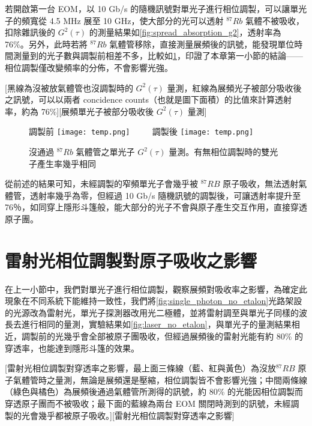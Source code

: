 \documentclass[class=NCU_thesis, crop=false]{standalone}
\begin{document}
若開啟第一台 EOM，以 10 Gb/s 的隨機訊號對單光子進行相位調製，可以讓單光子的頻寬從 4.5 MHz 展至 10 GHz，使大部分的光可以透射 $^{87}Rb$ 氣體不被吸收，扣除雜訊後的 $G^2(\tau)$ 的測量結果如\cref{fig:spread_absorption_g2}，透射率為 76\%。另外，此時若將 $^{87}Rb$ 氣體管移除，直接測量展頻後的訊號，能發現單位時間測量到的光子數與調製前相差不多，比較如\cref{fig:spread_or_not}，印證了本章第一小節的結論——相位調製僅改變頻率的分佈，不會影響光強。

[黑線為沒被放氣體管也沒調製時的 $G^{2}(\tau)$ 量測，紅線為展頻光子被部分吸收後之訊號，可以以兩者 concidence counts（也就是圖下面積）的比值來計算透射率，約為 76\%][展頻單光子被部分吸收後 $G^{2}(\tau)$ 量測]

\begin{figure}[!hbt]
    \centering
    \subcaptionbox
        {調製前 
        \label{fig:subfig_fig1}}
        {\texttt{[image: temp.png]}}
    ~~~~
    \subcaptionbox
        {調製後
        \label{fig:subfig_fig2}}
        {\texttt{[image: temp.png]}}
    \caption{沒通過 $^{87}Rb$ 氣體管之單光子 $G^{2}(\tau)$ 量測。有無相位調製時的雙光子產生率幾乎相同}
    \label{fig:spread_or_not}
\end{figure}

從前述的結果可知，未經調製的窄頻單光子會幾乎被 $^{87}RB$ 原子吸收，無法透射氣體管，透射率幾乎為零，但經過 10 Gb/s 隨機訊號的調製後，可讓透射率提升至 76％，如同穿上隱形斗篷般，能大部分的光子不會與原子產生交互作用，直接穿透原子團。

\section{雷射光相位調製對原子吸收之影響}
在上一小節中，我們對單光子進行相位調製，觀察展頻對吸收率之影響，為確定此現象在不同系統下能維持一致性，我們將\cref{fig:single_photon_no_etalon}光路架設的光源改為雷射光，單光子探測器改用光二極體，並將雷射調至與單光子同樣的波長去進行相同的量測，實驗結果如\cref{fig:laser_no_etalon}，與單光子的量測結果相近，調製前的光幾乎會全部被原子團吸收，但經過展頻後的雷射光能有約 80\% 的穿透率，也能達到隱形斗篷的效果。

[雷射光相位調製對穿透率之影響，最上面三條線（藍、紅與黃色）為沒放$^{87}RB$ 原子氣體管時之量測，無論是展頻還是壓縮，相位調製皆不會影響光強；中間兩條線（綠色與橘色）為展頻後通過氣體管所測得的訊號，約 80\% 的光能因相位調製而穿透原子團而不被吸收；最下面的藍線為兩台 EOM 關閉時測到的訊號，未經調製的光會幾乎都被原子吸收。][雷射光相位調製對穿透率之影響]
\end{document}
